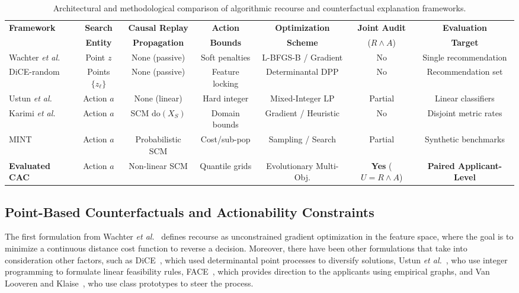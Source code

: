 \documentclass[nolineno]{paper/ieee-access/ieeeaccess}%
\newcommand{\CAC}{CAC}
\begin{document}
\begin{table}[t]
\caption{Architectural and methodological comparison of algorithmic recourse and counterfactual explanation frameworks.}
\label{tab:comparison}
\centering\footnotesize
\begin{tabular}{lcccccc}
\toprule
\textbf{Framework} & \textbf{Search} & \textbf{Causal Replay} & \textbf{Action} & \textbf{Optimization} & \textbf{Joint Audit} & \textbf{Evaluation} \\
 & \textbf{Entity} & \textbf{Propagation} & \textbf{Bounds} & \textbf{Scheme} & ($R \land A$) & \textbf{Target} \\
\midrule
Wachter \emph{et al.}~\cite{wachter2017counterfactual} & Point $z$ & None (passive) & Soft penalties & L-BFGS-B / Gradient & No & Single recommendation \\
DiCE-random~\cite{mothilal2020dice} & Points $\{z_\ell\}$ & None (passive) & Feature locking & Determinantal DPP & No & Recommendation set \\
Ustun \emph{et al.}~\cite{ustun2019actionable} & Action $a$ & None (linear) & Hard integer & Mixed-Integer LP & Partial & Linear classifiers \\
Karimi \emph{et al.}~\cite{karimi2021recourse} & Action $a$ & SCM $\mathrm{do}(X_S)$ & Domain bounds & Gradient / Heuristic & No & Disjoint metric rates \\
MINT~\cite{karimi2020imperfect} & Action $a$ & Probabilistic SCM & Cost/sub-pop & Sampling / Search & Partial & Synthetic benchmarks \\
\rowcolor{AccessPale}
\textbf{Evaluated \CAC{}} & Action $a$ & Non-linear SCM & Quantile grids & Evolutionary Multi-Obj. & \textbf{Yes} ($U=R \land A$) & \textbf{Paired Applicant-Level} \\
\bottomrule
\end{tabular}
\end{table}

\subsection{Point-Based Counterfactuals and Actionability Constraints}
The first formulation from Wachter \emph{et al.}~\cite{wachter2017counterfactual} defines recourse as unconstrained gradient optimization in the feature space, where the goal is to minimize a continuous distance cost function to reverse a decision. Moreover, there have been other formulations that take into consideration other factors, such as DiCE~\cite{mothilal2020dice}, which used determinantal point processes to diversify solutions, Ustun \emph{et al.}~\cite{ustun2019actionable}, who use integer programming to formulate linear feasibility rules, FACE~\cite{poyiadzi2020face}, which provides direction to the applicants using empirical graphs, and Van Looveren and Klaise~\cite{vanlooveren2021interpretable}, who use class prototypes to steer the process.
\end{document}
